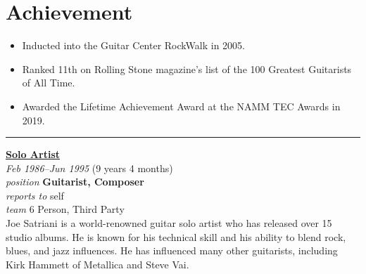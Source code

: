 \documentclass[12pt]{../templates/classes/res}
\begin{document}
\begin{resume}
\begin{minipage}[t]{0.55\linewidth}
\begin{multicols}{2}
    \section{}
  \end{multicols}
  \vspace{1pt}
\end{minipage}
\hfill
\begin{minipage}[t]{0.42\linewidth}
  \vspace{18pt}
  \section{Achievement}
  \begin{flushleft}
        \footnotesize{\begin{itemize}
\item Inducted into the Guitar Center RockWalk in 2005.
\item Ranked 11th on Rolling Stone magazine's list of the 100 Greatest Guitarists of All Time.
\item Awarded the Lifetime Achievement Award at the NAMM TEC Awards in 2019.
\end{itemize}}
  \end{flushleft}
\end{minipage}

\vspace{10pt}
\rule{1.0\textwidth}{0.1pt}
\begin{multicols}{2}
  {\large {\bf \href{https://www.joesatrianiuniverse.com/}{Solo Artist}}} \\
  {\footnotesize{\sl Feb 1986--Jun 1995} \hfill (9 years 4 months)}\\
  {\footnotesize{\sl position} \hfill \bf{Guitarist, Composer}}\\
  {\footnotesize{\sl reports to} \hfill self}\\
  {\footnotesize{\sl team} \hfill 6 Person, Third Party}\\

  \columnbreak
  {\footnotesize{Joe Satriani is a world-renowned guitar solo artist who has released over 15 studio albums. He is known for his technical skill and his ability to blend rock, blues, and jazz influences. He has influenced many other guitarists, including Kirk Hammett of Metallica and Steve Vai.}}\\
\end{multicols}
\vspace{-20pt}


\end{resume}
\end{document}
